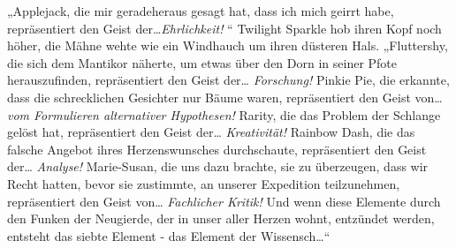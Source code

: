 „Applejack, die mir geradeheraus gesagt hat, dass ich mich geirrt habe, repräsentiert den Geist der…\emph{Ehrlichkeit!} “ Twilight Sparkle hob ihren Kopf noch höher, die Mähne wehte wie ein Windhauch um ihren düsteren Hals. „Fluttershy, die sich dem Mantikor näherte, um etwas über den Dorn in seiner Pfote herauszufinden, repräsentiert den Geist der… \emph{Forschung!} Pinkie Pie, die erkannte, dass die schrecklichen Gesichter nur Bäume waren, repräsentiert den Geist von… \emph{vom Formulieren alternativer Hypothesen!} Rarity, die das Problem der Schlange gelöst hat, repräsentiert den Geist der… \emph{Kreativität!} Rainbow Dash, die das falsche Angebot ihres Herzenswunsches durchschaute, repräsentiert den Geist der… \emph{Analyse!} Marie-Susan, die uns dazu brachte, sie zu überzeugen, dass wir Recht hatten, bevor sie zustimmte, an unserer Expedition teilzunehmen, repräsentiert den Geist von… \emph{Fachlicher Kritik!} Und wenn diese Elemente durch den Funken der Neugierde, der in unser aller Herzen wohnt, entzündet werden, entsteht das siebte Element - das Element der Wissensch…“


